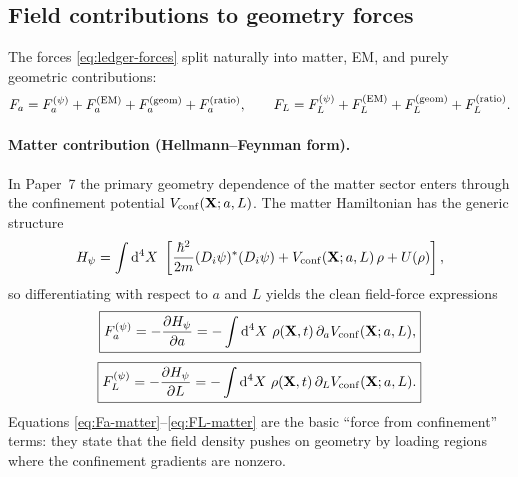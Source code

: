 \documentclass[11pt]{article}
\begin{document}
\subsection{Field contributions to geometry forces}
\label{sec:geometry-fieldforces}

The forces \eqref{eq:ledger-forces} split naturally into matter, EM, and purely geometric contributions:
\begin{equation}
F_a = F_a^{(\psi)} + F_a^{({\rm EM})} + F_a^{({\rm geom})} + F_a^{({\rm ratio})},
\qquad
F_L = F_L^{(\psi)} + F_L^{({\rm EM})} + F_L^{({\rm geom})} + F_L^{({\rm ratio})}.
\end{equation}

\paragraph{Matter contribution (Hellmann--Feynman form).}
In Paper~7 the primary geometry dependence of the matter sector enters through the confinement potential $V_{\rm conf}(\mathbf{X};a,L)$. The matter Hamiltonian has the generic structure
\begin{equation}
H_\psi = \int \dd^4X\ \left[
\frac{\hbar^2}{2m}(D_i\psi)^*(D_i\psi)
+ V_{\rm conf}(\mathbf{X};a,L)\,\rho
+ U(\rho)
\right],
\end{equation}
so differentiating with respect to $a$ and $L$ yields the clean field-force expressions
\begin{equation}
\boxed{
F_a^{(\psi)} = -\frac{\partial H_\psi}{\partial a}
=
-\int \dd^4X\ \rho(\mathbf{X},t)\,\partial_a V_{\rm conf}(\mathbf{X};a,L),
}
\label{eq:Fa-matter}
\end{equation}
\begin{equation}
\boxed{
F_L^{(\psi)} = -\frac{\partial H_\psi}{\partial L}
=
-\int \dd^4X\ \rho(\mathbf{X},t)\,\partial_L V_{\rm conf}(\mathbf{X};a,L).
}
\label{eq:FL-matter}
\end{equation}
Equations \eqref{eq:Fa-matter}--\eqref{eq:FL-matter} are the basic ``force from confinement'' terms: they state that the field density pushes on geometry by loading regions where the confinement gradients are nonzero.
\end{document}
